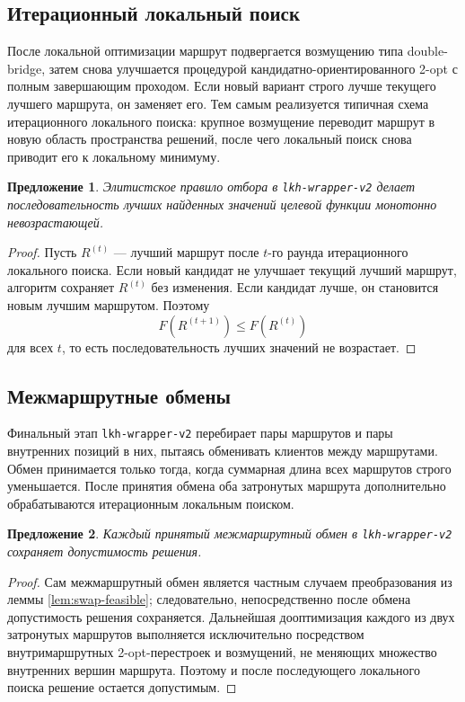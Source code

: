 \documentclass[a4paper,12pt]{article}
\newtheorem{proposition}{Предложение}[section]
\newcommand{\obj}{F}
\begin{document}
\subsection{Итерационный локальный поиск}

После локальной оптимизации маршрут подвергается возмущению типа double-bridge, затем снова
улучшается процедурой кандидатно-ориентированного 2-opt с полным завершающим проходом. Если
новый вариант строго лучше текущего лучшего маршрута, он заменяет его. Тем самым реализуется
типичная схема итерационного локального поиска: крупное возмущение переводит маршрут в новую
область пространства решений, после чего локальный поиск снова приводит его к локальному
минимуму.

\begin{proposition}
Элитистское правило отбора в \texttt{lkh-wrapper-v2} делает последовательность лучших
найденных значений целевой функции монотонно невозрастающей.
\end{proposition}

\begin{proof}
Пусть \(R^{(t)}\) --- лучший маршрут после \(t\)-го раунда итерационного локального поиска.
Если новый кандидат не улучшает текущий лучший маршрут, алгоритм сохраняет \(R^{(t)}\) без
изменения. Если кандидат лучше, он становится новым лучшим маршрутом. Поэтому
\[
\obj(R^{(t+1)}) \le \obj(R^{(t)})
\]
для всех \(t\), то есть последовательность лучших значений не возрастает.
\end{proof}

\subsection{Межмаршрутные обмены}

Финальный этап \texttt{lkh-wrapper-v2} перебирает пары маршрутов и пары внутренних позиций в
них, пытаясь обменивать клиентов между маршрутами. Обмен принимается только тогда, когда
суммарная длина всех маршрутов строго уменьшается. После принятия обмена оба затронутых
маршрута дополнительно обрабатываются итерационным локальным поиском.

\begin{proposition}
Каждый принятый межмаршрутный обмен в \texttt{lkh-wrapper-v2} сохраняет допустимость решения.
\end{proposition}

\begin{proof}
Сам межмаршрутный обмен является частным случаем преобразования из леммы
\ref{lem:swap-feasible}; следовательно, непосредственно после обмена допустимость решения
сохраняется. Дальнейшая дооптимизация каждого из двух затронутых маршрутов выполняется
исключительно посредством внутримаршрутных 2-opt-перестроек и возмущений, не меняющих
множество внутренних вершин маршрута. Поэтому и после последующего локального поиска
решение остается допустимым.
\end{proof}
\end{document}
